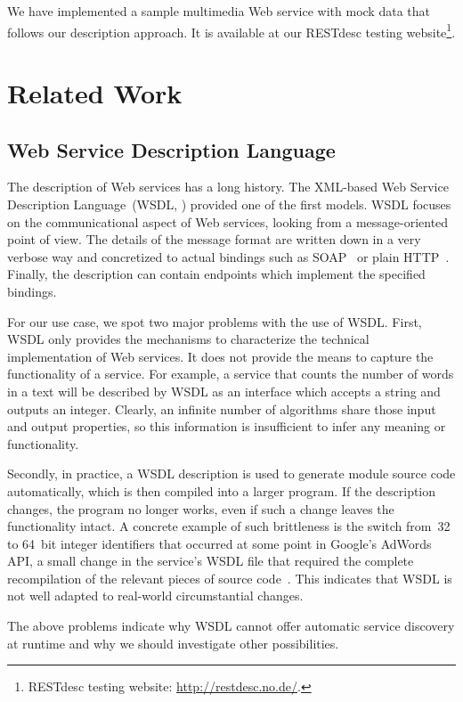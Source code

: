 \documentclass[runningheads,a4paper, twocolumn]{llncs}
\begin{document}
We have implemented a sample multimedia Web service with mock data that follows our description approach. It is available at our RESTdesc testing website\footnote{\label{RESTdescWebsite}RESTdesc testing website: \url{http://restdesc.no.de/}.}.

\section{Related Work} \label{sec:related-work}
\subsection{Web Service Description Language}
The description of Web services has a long history. The XML-based Web Service Description Language~(WSDL, \cite{WSDL1, WSDL2}) provided one of the first models. WSDL focuses on the communicational aspect of Web services, looking from a message-oriented point of view. The details of the message format are written down in a very verbose way and concretized to actual bindings such as SOAP~\cite{SOAP} or plain HTTP~\cite{HTTP}. Finally, the description can contain endpoints which implement the specified bindings.

For our use case, we spot two major problems with the use of WSDL. First, WSDL only provides the mechanisms to characterize the technical implementation of Web services. It does not provide the means to capture the functionality of a service. For example, a service that counts the number of words in a text will be described by WSDL as an interface which accepts a string and outputs an integer. Clearly, an infinite number of algorithms share those input and output properties, so this information is insufficient to infer any meaning or functionality.

Secondly, in practice, a WSDL description is used to generate module source code automatically, which is then compiled into a larger program. If the description changes, the program no longer works, even if such a change leaves the functionality intact. A concrete example of such brittleness is the switch from~32 to 64~bit integer identifiers that occurred at some point in Google's AdWords API, a small change in the service's WSDL file that required the complete recompilation of the relevant pieces of source code~\cite{WhySOAPSucks}. This indicates that WSDL is not well adapted to real-world circumstantial changes.

The above problems indicate why WSDL cannot offer automatic service discovery at runtime and why we should investigate other possibilities.
\end{document}

